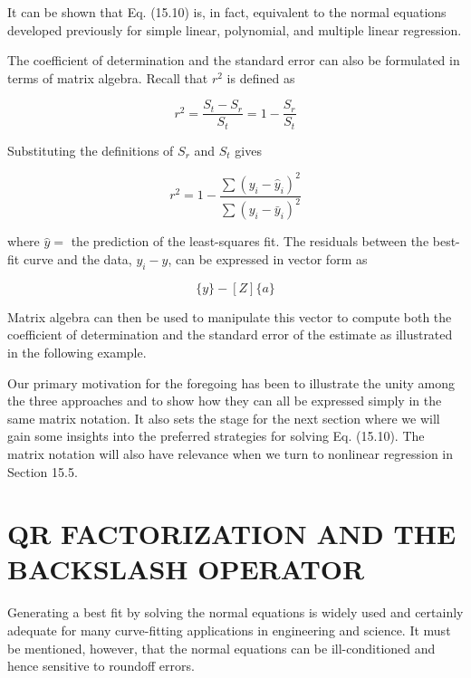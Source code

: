 \documentclass[../main.tex]{subfiles}
\begin{document}
\noindent It can be shown that Eq. (15.10) is, in fact, equivalent to the normal equations developed
previously for simple linear, polynomial, and multiple linear regression.

The coefficient of determination and the standard error can also be formulated in terms
of matrix algebra. Recall that $r^2$ is defined as

\begin{equation}
	r^2 = \frac{S_t - S_r}{S_t} = 1 - \frac{S_r}{S_t}
\end{equation}

\noindent Substituting the definitions of $S_r$ and $S_t$ gives

\begin{equation}
	r^2 = 1 - \frac{\sum {(y_i - \hat{y}_i)} ^ 2}{\sum {(y_i - \bar{y}_i)} ^ 2}
\end{equation}

\noindent where $\hat{y} =$ the prediction of the least-squares fit. The residuals between the best-fit curve and the data, $y_i - \hat{y}$, can be expressed in vector form as

\begin{equation}
	\{y\} - [Z] \{a\}
\end{equation}

Matrix algebra can then be used to manipulate this vector to compute both the coefficient of determination and the standard error of the estimate as illustrated in the following example.


Our primary motivation for the foregoing has been to illustrate the unity among the
three approaches and to show how they can all be expressed simply in the same matrix notation. It also sets the stage for the next section where we will gain some insights into the
preferred strategies for solving Eq. (15.10). The matrix notation will also have relevance
when we turn to nonlinear regression in Section 15.5.

\bigskip
\label{cha:cha_P_15_4} %
\section{QR FACTORIZATION AND THE BACKSLASH OPERATOR}

\noindent Generating a best fit by solving the normal equations is widely used and certainly adequate
for many curve-fitting applications in engineering and science. 
It must be mentioned, however, that the normal equations can be ill-conditioned and hence sensitive to roundoff errors.
\end{document}

